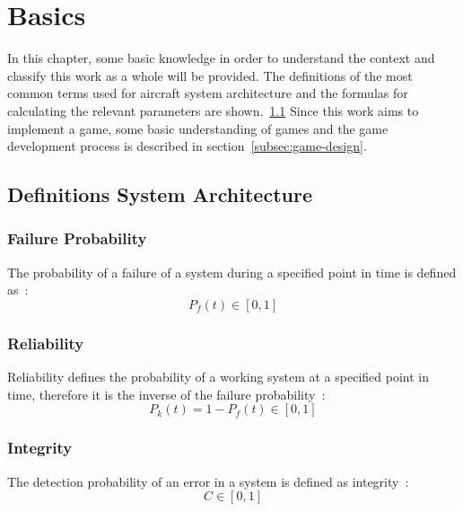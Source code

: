 \section{Basics}\label{sec:basics}
In this chapter, some basic knowledge in order to understand the context and classify this work as a whole will be provided.
The definitions of the most common terms used for aircraft system architecture and the formulas for calculating the relevant
parameters are shown.~\ref{subsec:definitions-system-architecture}
Since this work aims to implement a game, some basic understanding of games and the game development process is described in
section~\ref{subsec:game-design}.
\subsection{Definitions System Architecture}\label{subsec:definitions-system-architecture}
\subsubsection{Failure Probability}
The probability of a failure of a system during a specified point in time is defined as~\cite{lfs2}:
\begin{equation}
    \label{eq:failure-probability}
    P_f(t) \in [0,1]
\end{equation}
\subsubsection{Reliability}
Reliability defines the probability of a working system at a specified point in time,
therefore it is the inverse of the failure probability~\cite{lfs2}:
\begin{equation}
    \label{eq:reliability}
    P_k(t) = 1 - P_f(t) \in [0,1]
\end{equation}
\subsubsection{Integrity}
The detection probability of an error in a system is defined as integrity~\cite{lfs2}:
\begin{equation}
    \label{eq:integrity}
    C \in [0,1]
\end{equation}
